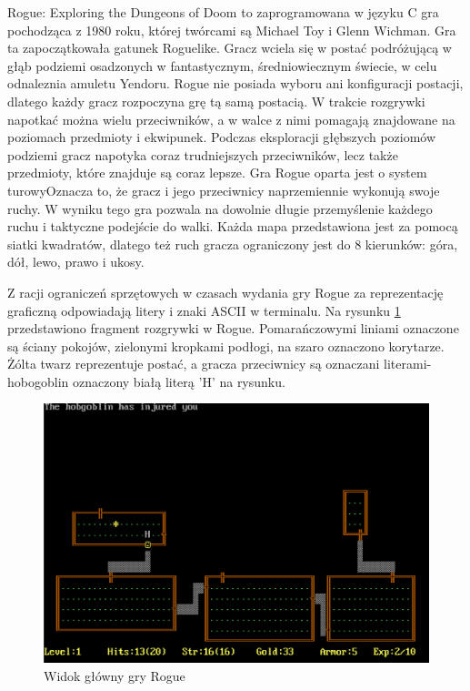 \documentclass[12pt,twoside]{article}
\begin{document}
Rogue: Exploring the Dungeons of Doom to zaprogramowana w języku C gra pochodząca z 1980 roku, której twórcami są Michael Toy i Glenn Wichman. Gra ta zapoczątkowała gatunek Roguelike. Gracz wciela się w postać podróżującą w głąb podziemi osadzonych w fantastycznym, średniowiecznym świecie, w celu odnaleznia amuletu Yendoru. Rogue nie posiada wyboru ani konfiguracji postacji, dlatego każdy gracz rozpoczyna grę tą samą postacią. W trakcie rozgrywki napotkać można wielu przeciwników, a w walce z nimi pomagają znajdowane na poziomach przedmioty i ekwipunek. Podczas eksploracji głębszych poziomów podziemi gracz napotyka coraz trudniejszych przeciwników, lecz także przedmioty, które znajduje są coraz lepsze. Gra Rogue oparta jest o system turowyOznacza to, że gracz i jego przeciwnicy naprzemiennie wykonują swoje ruchy. W wyniku tego gra pozwala na dowolnie długie przemyślenie każdego ruchu i taktyczne podejście do walki. Każda mapa przedstawiona jest za pomocą siatki kwadratów, dlatego też ruch gracza ograniczony jest do 8 kierunków: góra, dół, lewo, prawo i ukosy. 

Z racji ograniczeń sprzętowych w czasach wydania gry Rogue za reprezentację graficzną odpowiadają litery i znaki ASCII w terminalu. Na rysunku \ref{Rogue:scr1} przedstawiono fragment rozgrywki w  Rogue. Pomarańczowymi liniami oznaczone są ściany pokojów, zielonymi kropkami podłogi, na szaro oznaczono korytarze. Żólta twarz reprezentuje postać, a gracza przeciwnicy są oznaczani literami-  hobogoblin oznaczony białą literą 'H' na rysunku.

\FloatBarrier
\begin{figure}[h]
	\centering
	\includegraphics[width=12cm]{images/rogue/scr1.png}
	\caption{Widok główny gry Rogue}
	\label{Rogue:scr1}
\end{figure}
\FloatBarrier
\end{document}
